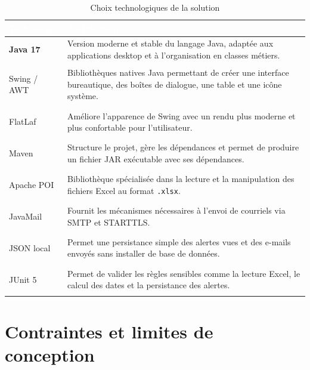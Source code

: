 \documentclass[12pt,a4paper,openany]{report}
\begin{document}
\begin{table}[H]
\centering
\small
\renewcommand{\arraystretch}{1.5}
\setlength{\arrayrulewidth}{1pt}

\begin{tabularx}{\textwidth}{|>{\raggedright\arraybackslash\bfseries}p{}|>{\raggedright\arraybackslash}X|}
\hline
\rowcolor{ondaBlue} 
\textcolor{white}{\textbf{Technologie}} & \textcolor{white}{\textbf{Justification}} \\
\hline

\rowcolor{ondaBlue!5} 
Java 17 & Version moderne et stable du langage Java, adaptée aux applications desktop et à l'organisation en classes métiers. \\
\hline

Swing / AWT & Bibliothèques natives Java permettant de créer une interface bureautique, des boîtes de dialogue, une table et une icône système. \\
\hline

\rowcolor{ondaBlue!5} 
FlatLaf & Améliore l'apparence de Swing avec un rendu plus moderne et plus confortable pour l'utilisateur. \\
\hline

Maven & Structure le projet, gère les dépendances et permet de produire un fichier JAR exécutable avec ses dépendances. \\
\hline

\rowcolor{ondaBlue!5} 
Apache POI & Bibliothèque spécialisée dans la lecture et la manipulation des fichiers Excel au format \texttt{.xlsx}. \\
\hline

JavaMail & Fournit les mécanismes nécessaires à l'envoi de courriels via SMTP et STARTTLS. \\
\hline

\rowcolor{ondaBlue!5} 
JSON local & Permet une persistance simple des alertes vues et des e-mails envoyés sans installer de base de données. \\
\hline

JUnit 5 & Permet de valider les règles sensibles comme la lecture Excel, le calcul des dates et la persistance des alertes. \\
\hline

\end{tabularx}
\caption{Choix technologiques de la solution}
\label{tab:choix-techno}
\end{table}

\section{Contraintes et limites de conception}
\end{document}

